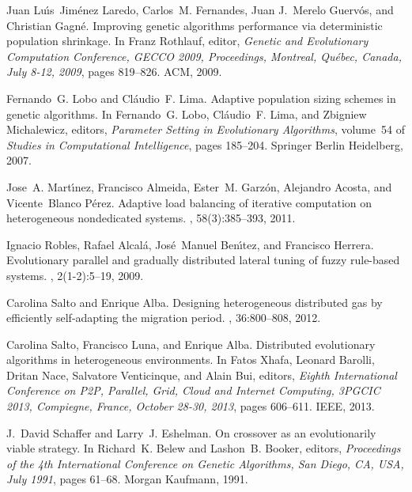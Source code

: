 \documentclass[final,1p,times]{elsarticle}
\begin{document}
\begin{thebibliography}{10}
Juan Lu{\'{\i}}s~Jim{\'{e}}nez Laredo, Carlos~M. Fernandes, Juan
  J.~Merelo Guerv{\'{o}}s, and Christian Gagn{\'{e}}.
\newblock Improving genetic algorithms performance via deterministic population
  shrinkage.
\newblock In Franz Rothlauf, editor, {\em Genetic and Evolutionary Computation
  Conference, {GECCO} 2009, Proceedings, Montreal, Qu{\'{e}}bec, Canada, July
  8-12, 2009}, pages 819--826. {ACM}, 2009.

Fernando~G. Lobo and Cl\'{a}udio~F. Lima.
\newblock Adaptive population sizing schemes in genetic algorithms.
\newblock In Fernando~G. Lobo, Cl\'{a}udio~F. Lima, and Zbigniew Michalewicz,
  editors, {\em Parameter Setting in Evolutionary Algorithms}, volume~54 of
  {\em Studies in Computational Intelligence}, pages 185--204. Springer Berlin
  Heidelberg, 2007.

Jose~A. Mart{\'{\i}}nez, Francisco Almeida, Ester~M. Garz{\'{o}}n, Alejandro
  Acosta, and Vicente~Blanco P{\'{e}}rez.
\newblock Adaptive load balancing of iterative computation on heterogeneous
  nondedicated systems.
, 58(3):385--393, 2011.

Ignacio Robles, Rafael Alcal{\'{a}}, Jos{\'{e}}~Manuel Ben{\'{\i}}tez, and
  Francisco Herrera.
\newblock Evolutionary parallel and gradually distributed lateral tuning of
  fuzzy rule-based systems.
, 2(1-2):5--19, 2009.

Carolina Salto and Enrique Alba.
\newblock Designing heterogeneous distributed gas by efficiently self-adapting
  the migration period.
, 36:800--808, 2012.

Carolina Salto, Francisco Luna, and Enrique Alba.
\newblock Distributed evolutionary algorithms in heterogeneous environments.
\newblock In Fatos Xhafa, Leonard Barolli, Dritan Nace, Salvatore Venticinque,
  and Alain Bui, editors, {\em Eighth International Conference on P2P,
  Parallel, Grid, Cloud and Internet Computing, 3PGCIC 2013, Compiegne, France,
  October 28-30, 2013}, pages 606--611. {IEEE}, 2013.

J.~David Schaffer and Larry~J. Eshelman.
\newblock On crossover as an evolutionarily viable strategy.
\newblock In Richard~K. Belew and Lashon~B. Booker, editors, {\em Proceedings
  of the 4th International Conference on Genetic Algorithms, San Diego, CA,
  USA, July 1991}, pages 61--68. Morgan Kaufmann, 1991.


\end{thebibliography}
\end{document}
